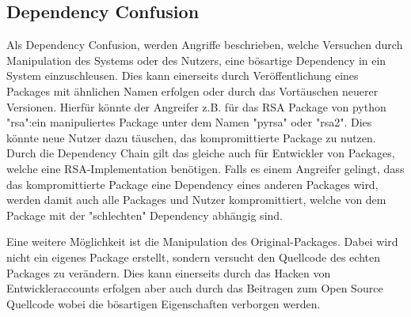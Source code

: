         \subsection{Dependency Confusion}
            Als Dependency Confusion, werden Angriffe beschrieben, welche Versuchen durch Manipulation des Systems oder des Nutzers, eine bösartige Dependency in ein System einzuschleusen. Dies kann einerseits durch Veröffentlichung eines Packages mit ähnlichen Namen erfolgen oder durch das Vortäuschen neuerer Versionen. Hierfür könnte der Angreifer z.B. für das RSA Package von python "rsa":ein manipuliertes Package unter dem Namen "pyrsa" oder "rsa2". Dies könnte neue Nutzer dazu täuschen, das kompromittierte Package zu nutzen. Durch die Dependency Chain gilt das gleiche auch für Entwickler von Packages, welche eine RSA-Implementation benötigen. Falls es einem Angreifer gelingt, dass das kompromittierte Package eine Dependency eines anderen Packages wird, werden damit auch alle Packages und Nutzer kompromittiert, welche von dem Package mit der "schlechten" Dependency abhängig sind.

            Eine weitere Möglichkeit ist die Manipulation des Original-Packages. Dabei wird nicht ein eigenes Package erstellt, sondern versucht den Quellcode des echten Packages zu verändern. Dies kann einerseits durch das Hacken von Entwickleraccounts erfolgen aber auch durch das Beitragen zum Open Source Quellcode wobei die bösartigen Eigenschaften verborgen werden.